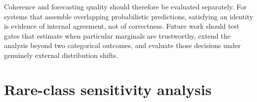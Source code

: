 \documentclass[a4paper,fleqn]{cas-sc}
\begin{document}
Coherence and forecasting quality should therefore be evaluated separately. For systems that assemble overlapping probabilistic predictions, satisfying an identity is evidence of internal agreement, not of correctness. Future work should test gates that estimate when particular marginals are trustworthy, extend the analysis beyond two categorical outcomes, and evaluate those decisions under genuinely external distribution shifts.

\appendix
\section{Rare-class sensitivity analysis}
\begin{table}
\centering
\caption{Rare-class exclusion sensitivity at the 256-row cap. Positive effects mean Selective CoRe is worse than arithmetic pooling.}
\end{table}
\end{document}

